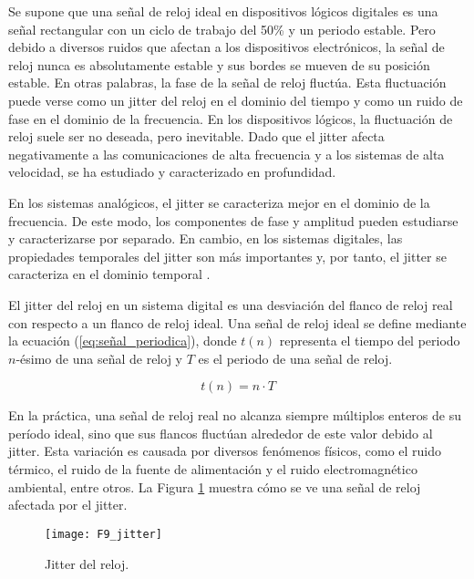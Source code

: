             Se supone que una señal de reloj ideal en dispositivos lógicos digitales es una señal rectangular con un ciclo de trabajo del 50\% y un periodo estable. Pero debido a diversos ruidos que afectan a los dispositivos electrónicos, la señal de reloj nunca es absolutamente estable y sus bordes se mueven de su posición estable. En otras palabras, la fase de la señal de reloj fluctúa. Esta fluctuación puede verse como un jitter del reloj en el dominio del tiempo y como un ruido de fase en el dominio de la frecuencia. En los dispositivos lógicos, la fluctuación de reloj suele ser no deseada, pero inevitable. Dado que el jitter afecta negativamente a las comunicaciones de alta frecuencia y a los sistemas de alta velocidad, se ha estudiado y caracterizado en profundidad.

            En los sistemas analógicos, el jitter se caracteriza mejor en el dominio de la frecuencia. De este modo, los componentes de fase y amplitud pueden estudiarse y caracterizarse por separado. En cambio, en los sistemas digitales, las propiedades temporales del jitter son más importantes y, por tanto, el jitter se caracteriza en el dominio temporal \cite{Fischer2003}.

            El jitter del reloj en un sistema digital es una desviación del flanco de reloj real con respecto a un flanco de reloj ideal. Una señal de reloj ideal se define mediante la ecuación (\ref{eq:señal_periodica}), donde $t(n)$ representa el tiempo del periodo $n$-ésimo de una señal de reloj y $T$ es el periodo de una señal de reloj.

            \begin{equation}
                t(n) = n \cdot T 
                \label{eq:señal_periodica}
            \end{equation}

            En la práctica, una señal de reloj real no alcanza siempre múltiplos enteros de su período ideal, sino que sus flancos fluctúan alrededor de este valor debido al jitter. Esta variación es causada por diversos fenómenos físicos, como el ruido térmico, el ruido de la fuente de alimentación y el ruido electromagnético ambiental, entre otros. La Figura \ref{fig:F9_jitter} muestra cómo se ve una señal de reloj afectada por el jitter.

            \begin{figure}[hbtp]
                \caption{Jitter del reloj.}
                \centering
                \texttt{[image: F9\_jitter]}
                \label{fig:F9_jitter}
            \end{figure}
                
